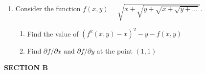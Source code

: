 \documentclass[12pt]{article} %
\theoremstyle{definition} %
\begin{document}
\begin{enumerate}
\item Consider the function $f(x,y)=\sqrt{x+\sqrt{y+\sqrt{x+\sqrt{y + \ldots }}}}$.
\begin{enumerate}
\item Find the value of $(f^2(x,y)-x)^2-y-f(x,y)$
\item Find $\partial f/\partial x$ and $\partial f/\partial y$ at the point $(1,1)$
\end{enumerate}





\end{enumerate}

\textbf{SECTION B}
\end{document}
